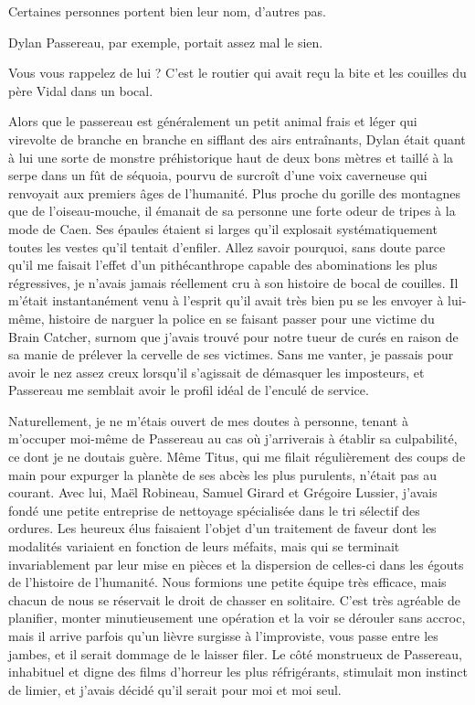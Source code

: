 \ornamentalrule

Certaines personnes portent bien leur nom, d’autres pas.

Dylan Passereau, par exemple, portait assez mal le sien.

Vous vous rappelez de lui ? C’est le routier qui avait reçu la bite et les couilles du père Vidal dans un bocal.

Alors que le passereau est généralement un petit animal frais et léger qui virevolte de branche en branche en sifflant des airs entraînants, Dylan était quant à lui une sorte de monstre préhistorique haut de deux bons mètres et taillé à la serpe dans un fût de séquoia, pourvu de surcroît d’une voix caverneuse qui renvoyait aux premiers âges de l’humanité. Plus proche du gorille des montagnes que de l’oiseau-mouche, il émanait de sa personne une forte odeur de tripes à la mode de Caen. Ses épaules étaient si larges qu’il explosait systématiquement toutes les vestes qu’il tentait d’enfiler. Allez savoir pourquoi, sans doute parce qu’il me faisait l’effet d’un pithécanthrope capable des abominations les plus régressives, je n’avais jamais réellement cru à son histoire de bocal de couilles. Il m’était instantanément venu à l’esprit qu’il avait très bien pu se les envoyer à lui-même, histoire de narguer la police en se faisant passer pour une victime du Brain Catcher, surnom que j’avais trouvé pour notre tueur de curés en raison de sa manie de prélever la cervelle de ses victimes. Sans me vanter, je passais pour avoir le nez assez creux lorsqu’il s’agissait de démasquer les imposteurs, et Passereau me semblait avoir le profil idéal de l’enculé de service.

Naturellement, je ne m’étais ouvert de mes doutes à personne, tenant à m’occuper moi-même de Passereau au cas où j’arriverais à établir sa culpabilité, ce dont je ne doutais guère. Même Titus, qui me filait régulièrement des coups de main pour expurger la planète de ses abcès les plus purulents, n’était pas au courant. Avec lui, Maël Robineau, Samuel Girard et Grégoire Lussier, j’avais fondé une petite entreprise de nettoyage spécialisée dans le tri sélectif des ordures. Les heureux élus faisaient l’objet d’un traitement de faveur dont les modalités variaient en fonction de leurs méfaits, mais qui se terminait invariablement par leur mise en pièces et la dispersion de celles-ci dans les égouts de l’histoire de l’humanité. Nous formions une petite équipe très efficace, mais chacun de nous se réservait le droit de chasser en solitaire. C’est très agréable de planifier, monter minutieusement une opération et la voir se dérouler sans accroc, mais il arrive parfois qu’un lièvre surgisse à l’improviste, vous passe entre les jambes, et il serait dommage de le laisser filer. Le côté monstrueux de Passereau, inhabituel et digne des films d’horreur les plus réfrigérants, stimulait mon instinct de limier, et j’avais décidé qu’il serait pour moi et moi seul.

